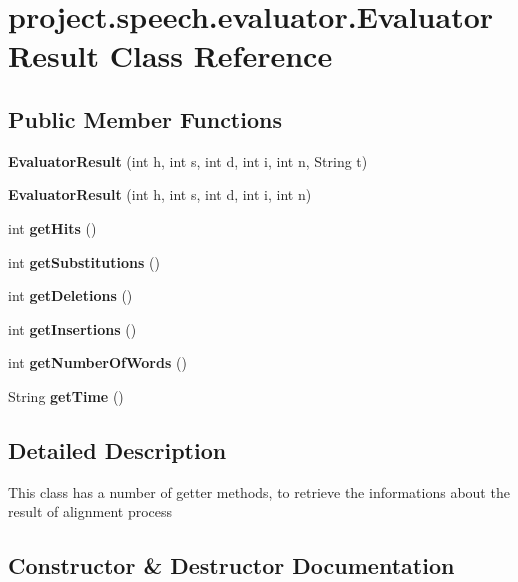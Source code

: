 \section{project.\+speech.\+evaluator.\+Evaluator\+Result Class Reference}
\label{classproject_1_1speech_1_1evaluator_1_1_evaluator_result}
\subsection*{Public Member Functions}
\begin{DoxyCompactItemize}
\item 
{\bf Evaluator\+Result} (int h, int s, int d, int i, int n, String t)
\item 
{\bf Evaluator\+Result} (int h, int s, int d, int i, int n)
\item 
int {\bf get\+Hits} ()
\item 
int {\bf get\+Substitutions} ()
\item 
int {\bf get\+Deletions} ()
\item 
int {\bf get\+Insertions} ()
\item 
int {\bf get\+Number\+Of\+Words} ()
\item 
String {\bf get\+Time} ()
\end{DoxyCompactItemize}


\subsection{Detailed Description}
This class has a number of getter methods, to retrieve the informations about the result of alignment process 

\subsection{Constructor \& Destructor Documentation}

